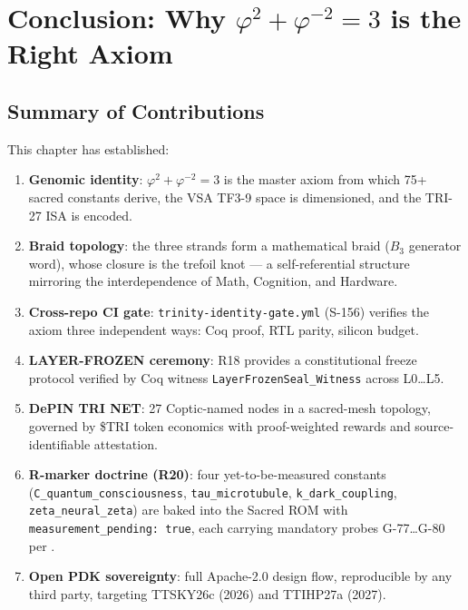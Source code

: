 
\section{Conclusion: Why \(\varphi^2 + \varphi^{-2} = 3\) is the Right Axiom}
\label{sec:flos74-conclusion}

\subsection{Summary of Contributions}

This chapter has established:
\begin{enumerate}
  \item \textbf{Genomic identity}: \(\varphi^2 + \varphi^{-2} = 3\) is the master
        axiom from which 75+ sacred constants derive, the VSA TF3-9 space is
        dimensioned, and the TRI-27 ISA is encoded.
  \item \textbf{Braid topology}: the three strands form a mathematical braid
        (\(B_3\) generator word), whose closure is the trefoil knot — a
        self-referential structure mirroring the interdependence of Math,
        Cognition, and Hardware.
  \item \textbf{Cross-repo CI gate}: \texttt{trinity-identity-gate.yml}
        (S-156) verifies the axiom three independent ways: Coq proof, RTL
        parity, silicon budget.
  \item \textbf{LAYER-FROZEN ceremony}: R18 provides a constitutional freeze
        protocol verified by Coq witness \texttt{LayerFrozenSeal\_Witness}
        across L0\ldots L5.
  \item \textbf{DePIN TRI NET}: 27 Coptic-named nodes in a sacred-mesh
        topology, governed by \$TRI token economics with proof-weighted rewards
        and source-identifiable attestation.
  \item \textbf{R-marker doctrine (R20)}: four yet-to-be-measured constants
        (\texttt{C\_quantum\_consciousness}, \texttt{tau\_microtubule},
        \texttt{k\_dark\_coupling}, \texttt{zeta\_neural\_zeta}) are baked
        into the Sacred ROM with \texttt{measurement\_pending: true}, each
        carrying mandatory probes G-77\ldots G-80 per
        \cite{trinity-fpga:r-markers,trinity-fpga:r20-doc}.
  \item \textbf{Open PDK sovereignty}: full Apache-2.0 design flow,
        reproducible by any third party, targeting TTSKY26c (2026) and
        TTIHP27a (2027).
\end{enumerate}


